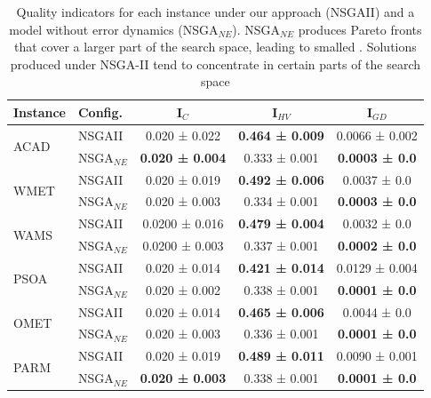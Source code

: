 \documentclass[conference]{IEEEtran}
\begin{document}
\begin{table}[htbp]
  \centering
  \caption{Quality indicators for each instance under our approach (NSGAII) and a model without error dynamics (NSGA$_{NE}$). NSGA$_{NE}$ produces Pareto fronts that cover a larger part of the search space, leading to smalled . Solutions produced under NSGA-II tend to concentrate in certain parts of the search space}
    \begin{tabular}{p{0.8cm}p{1.0cm}ccc}
    \toprule
    \textbf{Instance} & \textbf{Config.} & \textbf{I$_{C}$} & \textbf{I$_{HV}$} & \textbf{I$_{GD}$} \\
    \midrule
    \multirow{2}[2]{*}{ACAD} & NSGAII & 0.020 ± 0.022 & \textbf{0.464 ± 0.009} & 0.0066 ± 0.002 \\
          & NSGA$_{NE}$ & \textbf{0.020 ± 0.004} & 0.333 ± 0.001 & \textbf{0.0003 ± 0.0} \\
    \multirow{2}[2]{*}{WMET} & NSGAII & 0.020 ± 0.019 & \textbf{0.492 ± 0.006} & 0.0037 ± 0.0 \\
          & NSGA$_{NE}$ & 0.020 ± 0.003 & 0.334 ± 0.001 & \textbf{0.0003 ± 0.0} \\
    \multirow{2}[2]{*}{WAMS} & NSGAII & 0.0200 ± 0.016 & \textbf{0.479 ± 0.004} & 0.0032 ± 0.0 \\
          & NSGA$_{NE}$ & 0.0200 ± 0.003 & 0.337 ± 0.001 & \textbf{0.0002 ± 0.0} \\
    \multirow{2}[2]{*}{PSOA} & NSGAII & 0.020 ± 0.014 & \textbf{0.421 ± 0.014} & 0.0129 ± 0.004 \\
          & NSGA$_{NE}$ & 0.020 ± 0.002 & 0.338 ± 0.001 & \textbf{0.0001 ± 0.0} \\
    \multirow{2}[2]{*}{OMET} & NSGAII & 0.020 ± 0.014 & \textbf{0.465 ± 0.006} & 0.0044 ± 0.0 \\
          & NSGA$_{NE}$ & 0.020 ± 0.003 & 0.336 ± 0.001 & \textbf{0.0001 ± 0.0} \\
    \multirow{2}[2]{*}{PARM} & NSGAII & 0.020 ± 0.019 & \textbf{0.489 ± 0.011} & 0.0090 ± 0.001 \\
          & NSGA$_{NE}$ & \textbf{0.020 ± 0.003} & 0.338 ± 0.001 & \textbf{0.0001 ± 0.0} \\
    \bottomrule
    \end{tabular}%
\end{table}%
\end{document}
